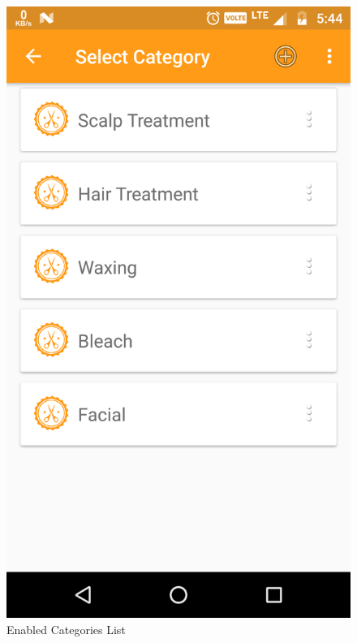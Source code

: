 \\
\begin{figure}[h]
	\centering
	\includegraphics[width=0.7\linewidth]{EnabledCategories}
	\caption{Enabled Categories List}
\end{figure}
\pagebreak

